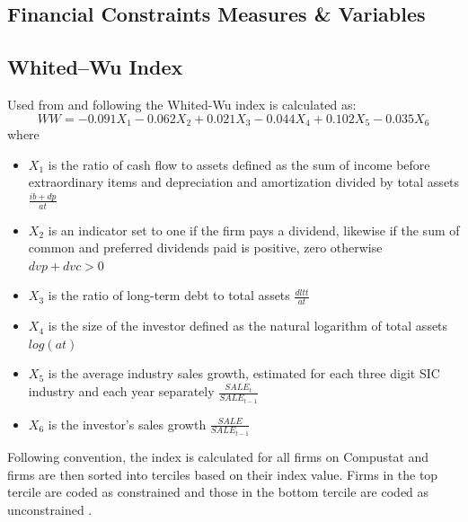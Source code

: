 \documentclass[12pt]{article}
\begin{document}
\begin{appendices}
	\renewcommand{\appendixname}{Appendix}

	\section{Financial Constraints Measures \& Variables}

	\subsection*{Whited--Wu Index}
	\noindent Used from \citet[p.543]{Whited2006} and following \citet[p.38]{Farre-mensa2013} the Whited-Wu index is calculated as:
		\begin{equation*}
		WW=-0.091X_{1}-0.062X_{2}+0.021X_{3}-0.044X_{4}+0.102X_{5}-0.035X_{6}
		\end{equation*}
	where
	\begin{itemize}
	\renewcommand\labelitemi{}
		\item $X_{1}$ is the ratio of cash flow to assets defined as the sum of income before extraordinary items and depreciation and amortization divided by total assets $\frac{ib+dp}{at}$
		\item $X_{2}$ is an indicator set to one if the firm pays a dividend, likewise if the sum of common and preferred dividends paid is positive, zero otherwise $dvp+dvc>0$
		\item $X_{3}$ is the ratio of long-term debt to total assets $\frac{dltt}{at}$
		\item $X_{4}$ is the size of the investor defined as the natural logarithm of total assets $log(at)$
		\item $X_{5}$ is the average industry sales growth, estimated for each three digit SIC industry and each year separately $\frac{SALE_{t}}{SALE_{t-1}}$
		\item $X_{6}$ is the investor's sales growth $\frac{SALE}{SALE_{t-1}}$
	\end{itemize}

	\noindent Following convention, the index is calculated for all firms on Compustat and firms are then sorted into terciles based on their index value. Firms in the top tercile are coded as constrained and those in the bottom tercile are coded as unconstrained \citep[p.38]{Farre-mensa2013}. 


\end{appendices}
\end{document}
